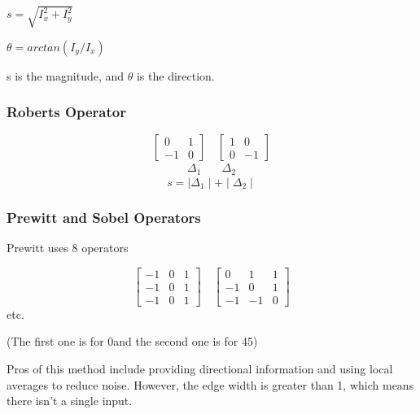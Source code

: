 \documentclass{article}
\begin{document}
\begin{multicols}{2}
$s = \sqrt{I_x^2 + I_y^2}$

$\theta = arctan(I_y/I_x)$

s is the magnitude, and $\theta$ is the direction.

\subsubsection{Roberts Operator}

        \[
          \begin{bmatrix}
            0 & 1\\
            -1 & 0
          \end{bmatrix}\quad
          \begin{bmatrix}
            1 & 0\\
            0 & -1
          \end{bmatrix}
        \]
        \[
          \begin{matrix}
            \Delta_1
          \end{matrix}\quad
          \begin{matrix}
            \Delta_2
          \end{matrix}
        \]
\[s = \mid\Delta_1\mid + \mid\Delta_2\mid\]

\subsubsection{Prewitt and Sobel Operators}

Prewitt uses 8 operators

        \[
          \begin{bmatrix}
            -1 & 0 & 1\\
            -1 & 0 & 1\\
            -1 & 0 & 1
          \end{bmatrix}\quad
          \begin{bmatrix}
            0 & 1 & 1\\
            -1 & 0 & 1\\
            -1 & -1 & 0
          \end{bmatrix}
        \]
etc.

(The first one is for 0\textdegree and the second one is for 45\textdegree)

Pros of this method include providing directional information and using local averages to reduce noise. However, the edge width is greater than 1, which means there isn't a single input.


\end{multicols}
\end{document}
